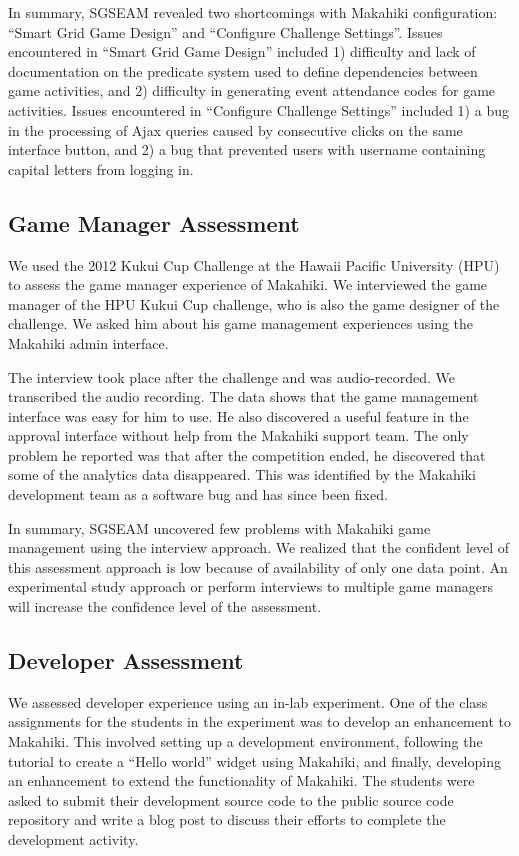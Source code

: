 \documentclass{sigchi}
\begin{document}
In summary, SGSEAM revealed two shortcomings with Makahiki configuration: ``Smart
Grid Game Design'' and ``Configure Challenge Settings''. Issues encountered in ``Smart Grid Game
Design'' included 1) difficulty and lack of documentation on the predicate system used to define dependencies
between game activities, and 2) difficulty in generating event attendance codes for game activities.
Issues encountered in ``Configure Challenge Settings'' included 1) a bug in the processing of Ajax queries
caused by consecutive clicks on the same interface button, and 2) a bug that prevented users with username
containing capital letters from logging in.

\subsection{Game Manager Assessment}

We used the 2012 Kukui Cup Challenge at the Hawaii Pacific University (HPU) to assess
the game manager experience of Makahiki. We interviewed the
game manager of the HPU Kukui Cup challenge, who is also the game designer of the challenge.
We asked him about his game management experiences using the Makahiki admin
interface.

The interview took place after the challenge and was audio-recorded. We transcribed the
audio recording. The data shows that the game management interface was easy for him to use.
He also discovered a useful feature in the approval interface without
help from the Makahiki support team. The only problem he reported was that after the
competition ended, he discovered that some of the analytics data disappeared. This was
identified by the Makahiki development team as a software bug and has since been fixed.

In summary, SGSEAM uncovered few problems with Makahiki game management using the interview
approach. We realized that the confident level of this assessment approach is low because of
 availability of only one data point. An experimental study approach or perform interviews to
multiple game managers will increase the confidence level of the assessment.

\subsection{Developer Assessment}

We assessed developer experience using an in-lab experiment. One of the class assignments
for the students in the experiment was to develop an enhancement to Makahiki.  This
involved setting up a development environment, following the tutorial to create a ``Hello
world'' widget using Makahiki, and finally, developing an enhancement to extend the
functionality of Makahiki. The students were asked to submit their development source code to the public source code repository and write a blog post to
discuss their efforts to complete the development activity.
\end{document}
